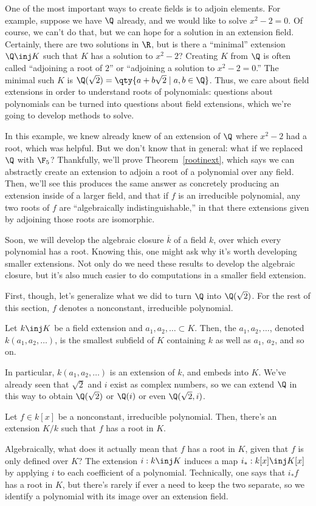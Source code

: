 One of the most important ways to create fields is to adjoin elements. For example, suppose we have $\Q$ already,
and we would like to solve $x^2 - 2 = 0$. Of course, we can't do that, but we can hope for a solution in an
extension field. Certainly, there are two solutions in $\R$, but is there a ``minimal'' extension $\Q\inj K$ such
that $K$ has a solution to $x^2 - 2$? Creating $K$ from $\Q$ is often called ``adjoining a root of $2$'' or
``adjoining a solution to $x^2 - 2 = 0$.'' The minimal such $K$ is $\Q(\sqrt 2) = \qty{a+b\sqrt 2\mid a,b\in\Q}$.
Thus, we care about field extensions in order to understand roots of polynomials: questions about polynomials can
be turned into questions about field extensions, which we're going to develop methods to solve.

In this example, we knew already knew of an extension of $\Q$ where $x^2 - 2$ had a root, which was helpful. But we
don't know that in general: what if we replaced $\Q$ with $\F_5$? Thankfully, we'll prove Theorem~\ref{rootinext},
which says we can abstractly create an extension to adjoin a root of a polynomial over any field. Then, we'll see
this produces the same answer as concretely producing an extension inside of a larger field, and that if $f$ is an
irreducible polynomial, any two roots of $f$ are ``algebraically indistinguishable,'' in that there extensions
given by adjoining those roots are isomorphic.

Soon, we will develop the algebraic closure $\overline k$ of a field $k$, over which every polynomial has a root.
Knowing this, one might ask why it's worth developing smaller extensions. Not only do we need these results to
develop the algebraic closure, but it's also much easier to do computations in a smaller field extension.

First, though, let's generalize what we did to turn $\Q$ into $\Q(\sqrt 2)$. For the rest of this section, $f$
denotes a nonconstant, irreducible polynomial.
\begin{defn}
\label{fieldgen}
Let $k\inj K$ be a field extension and $a_1,a_2,\dotsc\subset K$. Then, the 
$a_1,a_2,\dotsc$, denoted $k(a_1,a_2,\dotsc)$, is the smallest subfield of $K$ containing $k$ as well as $a_1$,
$a_2$, and so on.
\end{defn}
In particular, $k(a_1,a_2,\dotsc)$ is an extension of $k$, and embeds into $K$. We've already seen that $\sqrt
2$ and $i$ exist as complex numbers, so we can extend $\Q$ in this way to obtain $\Q(\sqrt 2)$ or $\Q(i)$ or even
$\Q(\sqrt 2,i)$.
\begin{thm}
\label{rootinext}
Let $f\in k[x]$ be a nonconstant, irreducible polynomial. Then, there's an extension $K/k$ such that $f$ has a root
in $K$.
\end{thm}
Algebraically, what does it actually mean that $f$ has a root in $K$, given that $f$ is only defined over $K$? The
extension $i:k\inj K$ induces a map $i_*:k[x]\inj K[x]$ by applying $i$ to each coefficient of a polynomial.
Technically, one says that $i_*f$ has a root in $K$, but there's rarely if ever a need to keep the two separate, so
we identify a polynomial with its image over an extension field.

